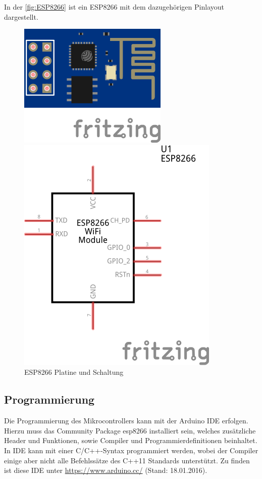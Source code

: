 In der \autoref{fig:ESP8266} ist ein ESP8266 mit dem dazugehörigen Pinlayout dargestellt.

\begin{figure}
	\centering
	\begin{minipage}{0.45\textwidth}
			\includegraphics[scale=1.5]{Abbildungen/ESP8266A}
	\end{minipage}
	\hfill
	\begin{minipage}{0.45\textwidth} 
			\includegraphics[scale=1.5]{Abbildungen/ESP8266}
	\end{minipage}
	\caption{ESP8266 Platine und Schaltung}
	\label{fig:ESP8266}
\end{figure}

\subsection{Programmierung}
Die Programmierung des Mikrocontrollers kann mit der Arduino IDE erfolgen. Hierzu muss das Community Package esp8266 installiert sein, welches zusätzliche Header und Funktionen, sowie Compiler und Programmierdefinitionen beinhaltet.
In IDE kann mit einer C/C++-Syntax programmiert werden, wobei der Compiler einige aber nicht alle Befehlssätze des C++11 Standards unterstützt.
Zu finden ist diese IDE unter \url{https://www.arduino.cc/} (Stand: 18.01.2016).


